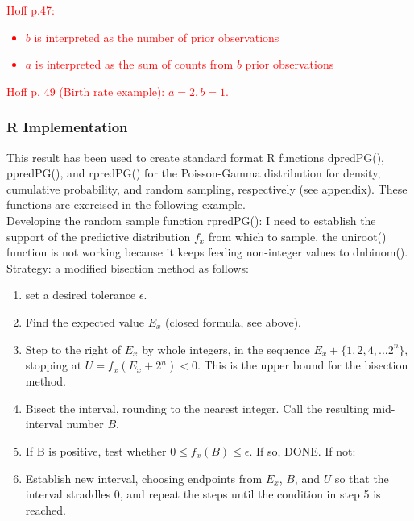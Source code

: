 \documentclass[12pt, a4paper]{article}
\begin{document}
\textcolor{red}{Hoff p.47:
  \begin{itemize}
    \item $b$ is interpreted as the number of prior observations
    \item $a$ is interpreted as the sum of counts from $b$ prior observations
  \end{itemize}
}

\textcolor{red}{  Hoff p. 49 (Birth rate example):  $a = 2, b = 1$. }


    \subsubsection{R Implementation}

This result has been used to create standard format R functions dpredPG(), ppredPG(), and rpredPG() for the Poisson-Gamma distribution for density, cumulative probability, and random sampling, respectively (see appendix).  These functions are exercised in the following example.\\

    Developing the random sample function rpredPG():  I need to establish the support of the predictive distribution $f_x$ from which to sample.  the uniroot() function is not working because it keeps feeding non-integer values to dnbinom().  Strategy: a modified bisection method as follows:\\

    \begin{enumerate}
      \item set a desired tolerance $\epsilon$.
      \item Find the expected value $E_x$ (closed formula, see above).
      \item Step to the right of $E_x$ by whole integers, in the sequence $E_x + \{1,2,4,...2^n\}$, stopping at $U=f_x\left(E_x + 2^n\right) < 0$.  This is the upper bound for the bisection method.
      \item Bisect the interval, rounding to the nearest integer.  Call the resulting mid-interval number $B$.
      \item If B is positive, test whether $0 \leq f_x(B) \leq \epsilon$.  If so, DONE.  If not:
      \item Establish new interval, choosing endpoints from $E_x$, $B$, and $U$ so that the interval straddles $0$, and repeat the steps until the condition in step 5 is reached.
    \end{enumerate}
\end{document}
